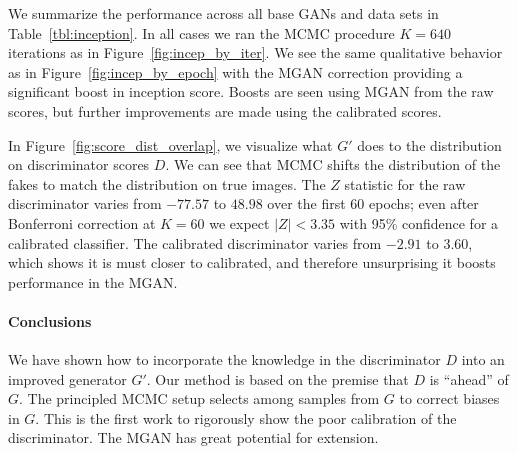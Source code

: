 \documentclass{article}
\begin{document}
We summarize the performance across all base GANs and data sets in Table~\ref{tbl:inception}.
In all cases we ran the MCMC procedure $K=640$ iterations as in Figure~\ref{fig:incep_by_iter}.
We see the same qualitative behavior as in Figure~\ref{fig:incep_by_epoch} with the MGAN correction providing a significant boost in inception score.
Boosts are seen using MGAN from the raw scores, but further improvements are made using the calibrated scores.

In Figure~\ref{fig:score_dist_overlap}, we visualize what $G'$ does to the distribution on discriminator scores $D$.
We can see that MCMC shifts the distribution of the fakes to match the distribution on true images.
The $Z$ statistic for the raw discriminator varies from $-77.57$ to $48.98$ over the first 60 epochs; even after Bonferroni correction at $K=60$ we expect $|Z| < 3.35$ with 95\% confidence for a calibrated classifier.
The calibrated discriminator varies from $-2.91$ to $3.60$, which shows it is must closer to calibrated, and therefore unsurprising it boosts performance in the MGAN\@.

\paragraph{Conclusions}
We have shown how to incorporate the knowledge in the discriminator $D$ into an improved generator $G'$.
Our method is based on the premise that $D$ is ``ahead'' of $G$.
The principled MCMC setup selects among samples from $G$ to correct biases in $G$.
This is the first work to rigorously show the poor calibration of the discriminator.
The MGAN has great potential for extension.  %


\end{document}
